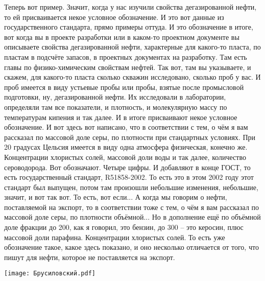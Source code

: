 \documentclass[main.tex]{subfiles}
\begin{document}
Теперь вот пример.
Значит, когда у нас изучили свойства дегазированной нефти, то ей присваивается некое условное обозначение.
И это вот данные из государственного стандарта, прямо примеры оттуда.
И это обозначение в итоге, вот когда вы в проекте разработки или в каком-то проектном документе вы описываете свойства дегазированной нефти, характерные для какого-то пласта, по пластам в подсчёте запасов, в проектных документах на разработку.
Там есть главы по физико-химическим свойствам нефтей.
Так вот, там вы указываете, и скажем, для какого-то пласта сколько скважин исследовано, сколько проб у вас.
И проб имеется в виду устьевые пробы или пробы, взятые после промысловой подготовки, ну, дегазированной нефти.
Их исследовали в лаборатории, определяли там все показатели, и плотность, и молекулярную массу  по температурам кипения и так далее.
И в итоге присваивают некое условное обозначение.
И вот здесь вот написано, что в соответствии с тем, о чём я вам рассказал по массовой доле серы, по плотности при стандартных условиях.
При 20 градусах Цельсия имеется в виду одна атмосфера физическая, конечно же.
Концентрации хлористых солей, массовой доли воды и так далее, количество сероводорода.
Вот обозначают.
Четыре цифры.
И добавляют в конце ГОСТ, то есть государственный стандарт, R51858-2002.
То есть это в этом 2002 году этот стандарт был выпущен, потом там произошли небольшие изменения, небольшие, значит, и вот так вот.
То есть, вот если...
А когда мы говорим о нефти, поставляемой на экспорт, то в соответствии тоже с тем, о чём я вам рассказал по массовой доле серы, по плотности объёмной...
Но в дополнение ещё по объёмной доле фракции до 200, как я говорил, это бензин, до 300 – это керосин, плюс массовой доли парафина.
Концентрации хлористых солей.
То есть уже обозначение такое, какое здесь показано, и оно несколько отличается от того, что пишут для нефти, которое не поставляется на экспорт.

\begin{center}
\texttt{[image: Брусиловский.pdf]}
\end{center}
\end{document}
